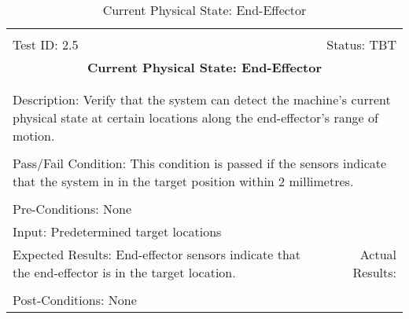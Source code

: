 \documentclass[titlepage]{article}
\begin{document}
\begin{center}%
\begin{table}
\begin{tabular}{|l r|}\hline&\\[-2mm]
	Test ID: 2.5	&Status: TBT\\[-3mm]
	\multicolumn{2}{|c|}{\textbf{\large{Current Physical State: End-Effector}}}\\&\\\hline&\\[-3mm]
	\multicolumn{2}{|p{\textwidth}|}{Description: Verify that the system can detect the machine's current physical state at certain locations along the end-effector's range of motion.}\\[1mm]\hline&\\[-3mm]
	\multicolumn{2}{|p{\textwidth}|}{Pass/Fail Condition: This condition is passed if the sensors indicate that the system in in the target position within 2 millimetres.}\\[1mm]\hline&\\[-3mm]
	\multicolumn{2}{|p{\textwidth}|}{Pre-Conditions: None}\\[4mm]
	\multicolumn{2}{|p{\textwidth}|}{Input: Predetermined target locations}\\[2mm]\hline
	\multicolumn{1}{|p{0.49\textwidth}}{Expected Results: End-effector sensors indicate that the end-effector is in the target location.}	&\multicolumn{1}{|p{0.45\textwidth}|}{Actual Results:}\\\hline&\\[-3mm]
	\multicolumn{2}{|p{\textwidth}|}{Post-Conditions: None}\\\hline
\end{tabular}
\caption{Current Physical State: End-Effector}
\end{table}
\end{center}
\end{document}
